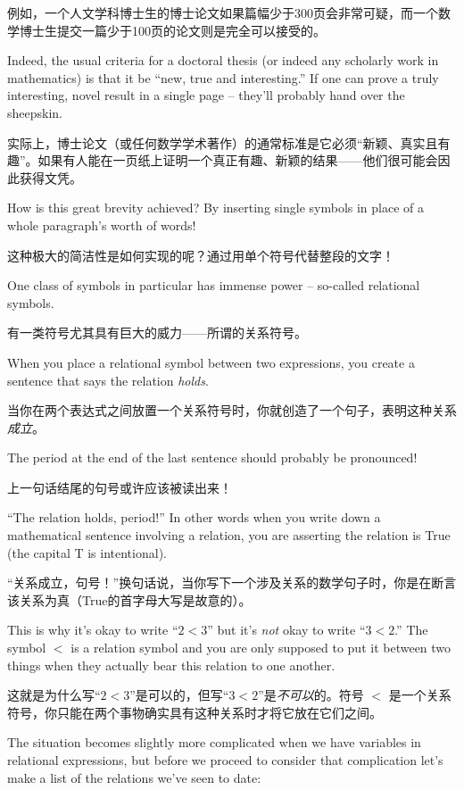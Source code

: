 例如，一个人文学科博士生的博士论文如果篇幅少于300页会非常可疑，而一个数学博士生提交一篇少于100页的论文则是完全可以接受的。

Indeed, the usual criteria for
a doctoral thesis (or indeed any scholarly work in mathematics) is
that it be ``new, true and interesting.''  If one can prove a truly 
interesting, novel result in a single page -- they'll probably hand over 
the sheepskin.

实际上，博士论文（或任何数学学术著作）的通常标准是它必须“新颖、真实且有趣”。如果有人能在一页纸上证明一个真正有趣、新颖的结果——他们很可能会因此获得文凭。

How is this great brevity achieved?  By inserting single symbols in place
of a whole paragraph's worth of words!

这种极大的简洁性是如何实现的呢？通过用单个符号代替整段的文字！

One class of symbols in particular
has immense power -- so-called  relational symbols.

有一类符号尤其具有巨大的威力——所谓的关系符号。

When you place a relational
symbol between two expressions, you create a sentence that says the
relation \emph{holds}.

当你在两个表达式之间放置一个关系符号时，你就创造了一个句子，表明这种关系\emph{成立}。

The period at the end of the last sentence should
probably be pronounced!

上一句话结尾的句号或许应该被读出来！

``The relation holds, period!''  In other words
when you write down a mathematical sentence involving a relation, you 
are asserting the relation is True (the capital T is intentional).

“关系成立，句号！”换句话说，当你写下一个涉及关系的数学句子时，你是在断言该关系为真（True的首字母大写是故意的）。

This is why it's okay to write ``$2 < 3$'' but it's \emph{not} okay to
write ``$3 < 2$.''  The symbol $<$ is a relation symbol and you are
only supposed to put it between two things when they actually bear this
relation to one another.

这就是为什么写“$2 < 3$”是可以的，但写“$3 < 2$”是\emph{不可以}的。符号 $<$ 是一个关系符号，你只能在两个事物确实具有这种关系时才将它放在它们之间。

The situation becomes slightly more complicated when we have 
variables in relational expressions, but before we proceed to
consider that complication let's make a list of the relations
we've seen to date:

